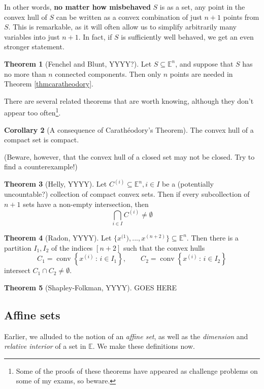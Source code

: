 \documentclass[11pt]{article}
\numberwithin{equation}{section}
\theoremstyle{definition}
\newtheorem{theorem}{Theorem}[section]
\newtheorem{corollary}[theorem]{Corollary}
\newcommand{\bE}{\mathbb{E}}
\newcommand{\set}[2]{\left\{#1\,:\,#2\right\}}
\newcommand{\conv}{\operatorname{conv}}
\begin{document}
In other words, \textbf{no matter how misbehaved} $S$ is as a set, any point in the convex hull of $S$ can be written as a convex combination of just $n+1$ points from $S$. This is remarkable, as it will often allow us to simplify arbitrarily many variables into just $n+1$. In fact, if $S$ is sufficiently well behaved, we get an even stronger statement.
\begin{theorem}[Fenchel and Blunt, YYYY?]
    Let $S\subseteq\bE^n$, and suppose that $S$ has no more than $n$ connected components. Then only $n$ points are needed in Theorem \ref{thmcaratheodory}.
\end{theorem}
There are several related theorems that are worth knowing, although they don't appear too often\footnote{Some of the proofs of these theorems have appeared as challenge problems on some of my exams, so beware.}.
\begin{corollary}[A consequence of Carath\'eodory's Theorem]
    The convex hull of a compact set is compact.
\end{corollary}
(Beware, however, that the convex hull of a closed set may not be closed. Try to find a counterexample!)
\begin{theorem}[Helly, YYYY]
    Let $C^{(i)}\subseteq \bE^n, i\in I$ be a (potentially uncountable?) collection of compact convex sets. Then if every subcollection of $n+1$ sets have a non-empty intersection, then
    \begin{equation}
        \bigcap_{i\in I} C^{(i)}\neq \emptyset
    \end{equation}
\end{theorem}
\begin{theorem}[Radon, YYYY]
    Let $\{x^{(1}), ..., x^{(n+2)}\}\subseteq\bE^n$. Then there is a partition $I_1, I_2$ of the indices $[n+2]$ such that the convex hulls
    \begin{equation}
    C_1=\conv\set{x^{(i)}}{i\in I_1},\qquad C_2=\conv\set{x^{(i)}}{i\in I_2}
    \end{equation}
    intersect $C_1\cap C_2\neq\emptyset$.
\end{theorem}
\begin{theorem}[Shapley-Folkman, YYYY]
    GOES HERE
\end{theorem}
\subsection{Affine sets}
Earlier, we alluded to the notion of an \textit{affine set}, as well as the \textit{dimension} and \textit{relative interior} of a set in $\bE$. We make these definitions now.
\end{document}
